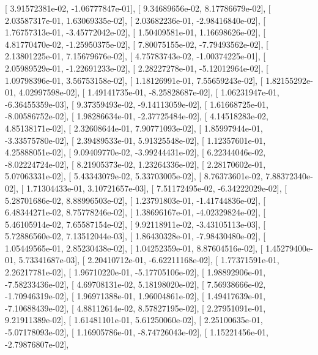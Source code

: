 \documentclass{article}
\begin{document}
       [  3.91572381e-02,  -1.06777847e-01],
       [  9.34689656e-02,   8.17786679e-02],
       [  2.03587317e-01,   1.63069335e-02],
       [  2.03682236e-01,  -2.98416840e-02],
       [  1.76757313e-01,  -3.45772042e-02],
       [  1.50409581e-01,   1.16698626e-02],
       [  4.81770470e-02,  -1.25950375e-02],
       [  7.80075155e-02,  -7.79493562e-02],
       [  2.13801225e-01,   7.15679676e-02],
       [  4.75783743e-02,  -1.00374225e-01],
       [  2.05989529e-01,  -1.22691233e-02],
       [  2.28227278e-01,  -5.12012964e-02],
       [  1.09798396e-01,   3.56753158e-02],
       [  1.18126991e-01,   7.55659243e-02],
       [  1.82155292e-01,   4.02997598e-02],
       [  1.49141735e-01,  -8.25828687e-02],
       [  1.06231947e-01,  -6.36455359e-03],
       [  9.37359493e-02,  -9.14113059e-02],
       [  1.61668725e-01,  -8.00586752e-02],
       [  1.98286634e-01,  -2.37725484e-02],
       [  4.14518283e-02,   4.85138171e-02],
       [  2.32608644e-01,   7.90771093e-02],
       [  1.85997944e-01,  -3.33575780e-02],
       [  2.39489533e-01,   5.91325548e-02],
       [  1.12357601e-01,   4.25888051e-02],
       [  9.09409770e-02,  -3.99244431e-02],
       [  6.22344046e-02,  -8.02224724e-02],
       [  8.21905373e-02,   1.23264336e-02],
       [  2.28170602e-01,   5.07063331e-02],
       [  5.43343079e-02,   5.33703005e-02],
       [  8.76373601e-02,   7.88372340e-02],
       [  1.71304433e-01,   3.10721657e-03],
       [  7.51172495e-02,  -6.34222029e-02],
       [  5.28701686e-02,   8.88996503e-02],
       [  1.23791803e-01,  -1.41744836e-02],
       [  6.48344271e-02,   8.75778246e-02],
       [  1.38696167e-01,  -4.02329824e-02],
       [  5.46105914e-02,   7.65587154e-02],
       [  9.92118911e-02,  -3.43105113e-03],
       [  5.72886560e-02,   7.13512044e-03],
       [  1.86430328e-01,  -7.98430480e-02],
       [  1.05449565e-01,   2.85230438e-02],
       [  1.04252359e-01,   8.87604516e-02],
       [  1.45279400e-01,   5.73341687e-03],
       [  2.20410712e-01,  -6.62211168e-02],
       [  1.77371591e-01,   2.26217781e-02],
       [  1.96710220e-01,  -5.17705106e-02],
       [  1.98892906e-01,  -7.58233436e-02],
       [  4.69708131e-02,   5.18198020e-02],
       [  7.56938666e-02,  -1.70946319e-02],
       [  1.96971388e-01,   1.96004861e-02],
       [  1.49417639e-01,  -7.10688439e-02],
       [  4.88112614e-02,   8.57827195e-02],
       [  2.27951091e-01,   9.21911389e-02],
       [  1.61481101e-01,   5.61250060e-02],
       [  2.25100635e-01,  -5.07178093e-02],
       [  1.16905786e-01,  -8.74726043e-02],
       [  1.15221456e-01,  -2.79876807e-02],
\end{document}
